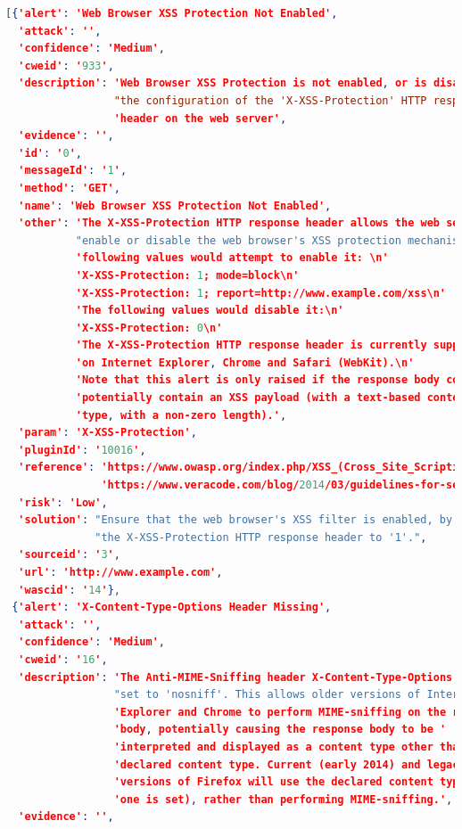 \begin{lstlisting}[language=json,label={lst:owas_zap_welcome_message_alerts},caption={Alerts showed with NGINX default configuration}]
[{'alert': 'Web Browser XSS Protection Not Enabled',
  'attack': '',
  'confidence': 'Medium',
  'cweid': '933',
  'description': 'Web Browser XSS Protection is not enabled, or is disabled by '
                 "the configuration of the 'X-XSS-Protection' HTTP response "
                 'header on the web server',
  'evidence': '',
  'id': '0',
  'messageId': '1',
  'method': 'GET',
  'name': 'Web Browser XSS Protection Not Enabled',
  'other': 'The X-XSS-Protection HTTP response header allows the web server to '
           "enable or disable the web browser's XSS protection mechanism. The "
           'following values would attempt to enable it: \n'
           'X-XSS-Protection: 1; mode=block\n'
           'X-XSS-Protection: 1; report=http://www.example.com/xss\n'
           'The following values would disable it:\n'
           'X-XSS-Protection: 0\n'
           'The X-XSS-Protection HTTP response header is currently supported '
           'on Internet Explorer, Chrome and Safari (WebKit).\n'
           'Note that this alert is only raised if the response body could '
           'potentially contain an XSS payload (with a text-based content '
           'type, with a non-zero length).',
  'param': 'X-XSS-Protection',
  'pluginId': '10016',
  'reference': 'https://www.owasp.org/index.php/XSS_(Cross_Site_Scripting)_Prevention_Cheat_Sheet\n'
               'https://www.veracode.com/blog/2014/03/guidelines-for-setting-security-headers/',
  'risk': 'Low',
  'solution': "Ensure that the web browser's XSS filter is enabled, by setting "
              "the X-XSS-Protection HTTP response header to '1'.",
  'sourceid': '3',
  'url': 'http://www.example.com',
  'wascid': '14'},
 {'alert': 'X-Content-Type-Options Header Missing',
  'attack': '',
  'confidence': 'Medium',
  'cweid': '16',
  'description': 'The Anti-MIME-Sniffing header X-Content-Type-Options was not '
                 "set to 'nosniff'. This allows older versions of Internet "
                 'Explorer and Chrome to perform MIME-sniffing on the response '
                 'body, potentially causing the response body to be '
                 'interpreted and displayed as a content type other than the '
                 'declared content type. Current (early 2014) and legacy '
                 'versions of Firefox will use the declared content type (if '
                 'one is set), rather than performing MIME-sniffing.',
  'evidence': '',

\end{lstlisting}
